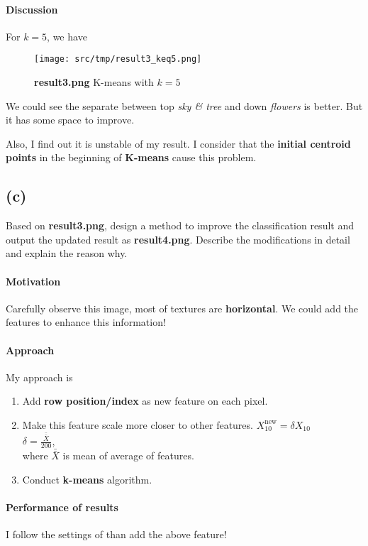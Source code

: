\paragraph{Discussion}
For \(k=5\), we have 
\begin{figure}
    \centering
    \texttt{[image: src/tmp/result3\_keq5.png]}
    \caption{\textbf{result3.png} K-means with \(k=5\)}
    \label{result3_keq5}
\end{figure}
We could see the separate between top \textit{sky \& tree} and down \textit{flowers} is better. But it has some space to improve.

Also, I find out it is \alert{unstable} of my result. I consider that the \textbf{initial centroid points} in the beginning of \textbf{K-means} cause this problem.

\subsection{(c)}\label{1_c}
Based on \textbf{result3.png}, design a method to improve the classification result and output the updated result as \textbf{result4.png}. Describe the modifications in detail and explain the reason why.

\paragraph{Motivation}
Carefully observe this image, most of textures are \textbf{horizontal}. We could add the features to enhance this information!

\paragraph{Approach}
My approach is
\begin{enumerate}
    \item Add \textbf{row position/index} as new feature on each pixel.
    \item Make this feature scale more closer to other features. \(X^{\mbox{new}}_{10} = \delta X_{10}\) \\
	\(\delta = \frac{\bar{\bar{X}}}{200}\), \\
	where \(\bar{\bar{X}}\) is mean of average of features.
    \item Conduct \textbf{k-means} algorithm.
\end{enumerate}

\paragraph{Performance of results}
I follow the settings of  than add the above feature!

